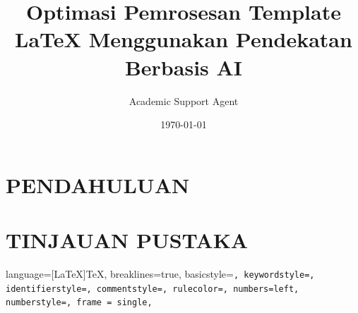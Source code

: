 \documentclass{EESD}
\title{Optimasi Pemrosesan Template LaTeX Menggunakan Pendekatan Berbasis AI}
\author{Academic Support Agent}
\date{\today}
\begin{document}
\maketitle

\begin{abstract}

\end{abstract}

\chapter{PENDAHULUAN}


\chapter{TINJAUAN PUSTAKA}




\usepackage{subcaption} %
\usepackage{graphicx}
\usepackage{tikz} %

\usepackage[absolute,overlay]{textpos} %
\usepackage{multicol} %
\graphicspath{{Figures/}}
\usepackage[utf8]{inputenc}
\usepackage{amsmath}
\usepackage{amsfonts}
\usepackage{amssymb}
\usepackage{lipsum} %
\usepackage{hyperref}
\usepackage{ragged2e} %

\usepackage[style=authortitle,backend=bibtex]{biblatex}
\AtBeginBibliography{\tiny} %
\renewcommand{\footnotesize}{\tiny}

\usepackage{listings}
\lstset
{
    language=[LaTeX]TeX,
    breaklines=true,
    basicstyle=\tt\scriptsize,
    keywordstyle=\color{blue},
    identifierstyle=\color{magenta},
    commentstyle=\color{red},
    rulecolor=\color{black},
    numbers=left,
    numberstyle=\tiny\color{black},
    frame = single,
}
\end{document}
